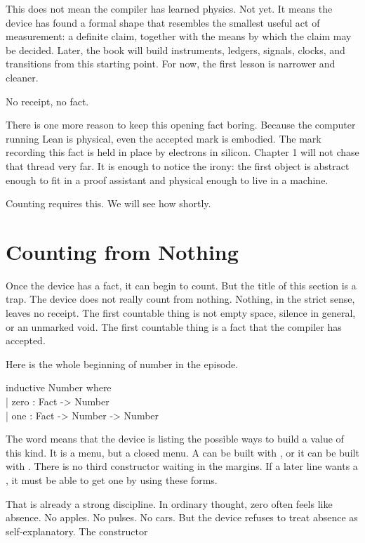 This does not mean the compiler has learned physics. Not yet. It means the
device has found a formal shape that resembles the smallest useful act of
measurement: a definite claim, together with the means by which the claim may
be decided. Later, the book will build instruments, ledgers, signals, clocks,
and transitions from this starting point. For now, the first lesson is narrower
and cleaner.

No receipt, no fact.

There is one more reason to keep this opening fact boring. Because the computer
running Lean is physical, even the accepted mark is embodied. The mark
recording this fact is held in place by electrons in silicon. Chapter 1 will
not chase that thread very far. It is enough to notice the irony: the first
object is abstract enough to fit in a proof assistant and physical enough to
live in a machine.

Counting requires this. We will see how shortly.


\section{Counting from Nothing}
\label{se:counting-from-nothing}

Once the device has a fact, it can begin to count. But the title of this
section is a trap. The device does not really count from nothing. Nothing, in
the strict sense, leaves no receipt. The first countable thing is not empty
space, silence in general, or an unmarked void. The first countable thing is a
fact that the compiler has accepted.

Here is the whole beginning of number in the episode.

\begin{leancode}
inductive Number where\\
\quad | zero : Fact -> Number\\
\quad | one  : Fact -> Number -> Number
\end{leancode}

The word  means that the device is listing the possible ways to
build a value of this kind. It is a menu, but a closed menu. A  can
be built with , or it can be built with . There is no
third constructor waiting in the margins. If a later line wants a
, it must be able to get one by using these forms.

That is already a strong discipline. In ordinary thought, zero often feels
like absence. No apples. No pulses. No cars. But the device refuses to treat
absence as self-explanatory. The constructor

